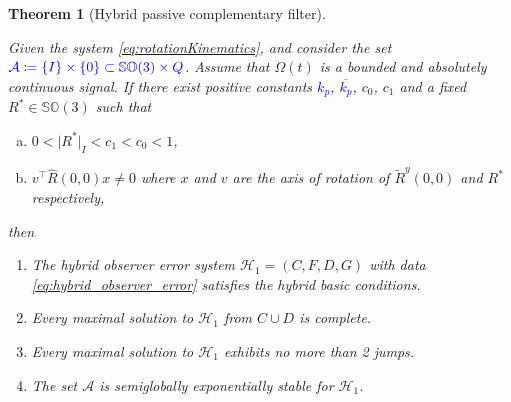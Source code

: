 \documentclass{article}
\newcommand{\SOthree}{\mathbb{SO}(3)}
\newtheorem{theorem}{Theorem}
\newcommand{\brackets}[1]{\left(#1\right)}
\newcommand{\textblue}[1]{\textcolor{blue}{#1}}
\newcommand{\Rtilde}{\tilde{R}}
\newcommand{\normSOthree}[1]{{{\vert}#1 {\vert}_I}}
\newcommand{\Rstar}{{R^*}}
\begin{document}
\begin{theorem}[Hybrid passive complementary filter]\label{theorem:main}

        Given the system \eqref{eq:rotationKinematics}, and consider the set $\textblue{\mathcal{A}\coloneqq \{I\}\times \{0\} \subset \SOthree\times Q}$. Assume that $\Omega(t)$ is a bounded and absolutely continuous signal. If there exist positive constants \textblue{$k_p$, $\overline{k_p}$}, $c_0$, $c_1$ and a fixed $R^*\in\SOthree$ such that %
        \begin{enumerate}[(a)]
        \item $0 < \normSOthree{\Rstar} < c_1 < c_0 < 1$,\label{item:a-bullet}
        \item {${v}^\top \hat{R}(0,0)x\neq 0$ where $x$ and $v$ are the axis of rotation of $\Rtilde^y(0,0)$ and $R^*$ respectively}, \label{item:b-bullet}
        \end{enumerate}
    \begingroup
    \renewcommand\labelenumi{(\theenumi)}
    then
    \begin{enumerate}
        \item \label{(1)}The hybrid observer error system $\mathcal{H}_1 = (C, F, D, G)$ with data \eqref{eq:hybrid_observer_error} satisfies the hybrid basic conditions.
        \item \label{(2)}Every maximal solution to $\mathcal{H}_1$ from $C\cup D$ is complete.
        \item \label{(3)} Every maximal solution to $\mathcal{H}_1$ exhibits no more than 2 jumps. 
        \item \label{(4)}The set $\mathcal{A}$ is semiglobally exponentially stable for $\mathcal{H}_1$. 
    \end{enumerate}
    \endgroup
    \end{theorem}
\end{document}
